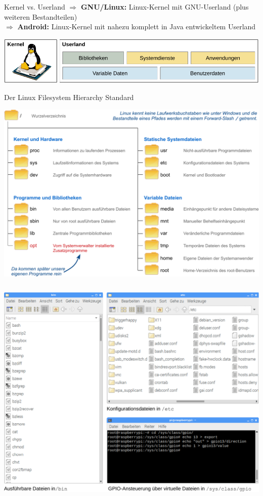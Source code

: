 {\begin{frame}{Kernel vs. Userland}
    \vfill
    $\Rightarrow$ \textbf{GNU/Linux:} Linux-Kernel mit GNU-Userland (plus weiteren Bestandteilen) \\
    $\Rightarrow$ \textbf{Android:} Linux-Kernel mit nahezu komplett in Java entwickeltem Userland

    \vfill
    \includegraphics[width=\textwidth]{8-linux/img/linux-bestandteile}
\end{frame}
}

{
\footnotesize

\begin{frame}[allowframebreaks]{Der Linux Filesystem Hierarchy Standard}
    \begin{center}
        \includegraphics[width=\textwidth]{8-linux/img/fhs-verzeichnisse}
    \end{center}

    \framebreak

    \begin{columns}[T]
        \includegraphics[width=\textwidth]{8-linux/img/fhs-beispiele}


\end{columns}
\end{frame}}
